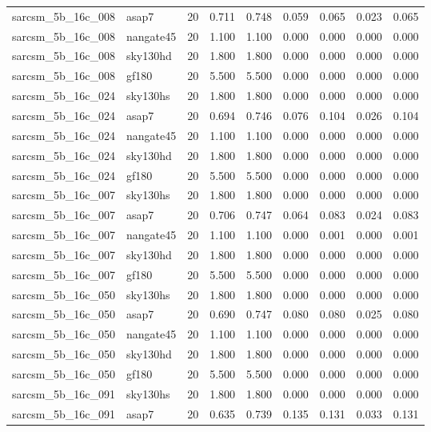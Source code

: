 \begin{tabular}{llrrrrrrr}
sarcsm\_5b\_16c\_008 & asap7 & 20 & 0.711 & 0.748 & 0.059 & 0.065 & 0.023 & 0.065 \\
sarcsm\_5b\_16c\_008 & nangate45 & 20 & 1.100 & 1.100 & 0.000 & 0.000 & 0.000 & 0.000 \\
sarcsm\_5b\_16c\_008 & sky130hd & 20 & 1.800 & 1.800 & 0.000 & 0.000 & 0.000 & 0.000 \\
sarcsm\_5b\_16c\_008 & gf180 & 20 & 5.500 & 5.500 & 0.000 & 0.000 & 0.000 & 0.000 \\
sarcsm\_5b\_16c\_024 & sky130hs & 20 & 1.800 & 1.800 & 0.000 & 0.000 & 0.000 & 0.000 \\
sarcsm\_5b\_16c\_024 & asap7 & 20 & 0.694 & 0.746 & 0.076 & 0.104 & 0.026 & 0.104 \\
sarcsm\_5b\_16c\_024 & nangate45 & 20 & 1.100 & 1.100 & 0.000 & 0.000 & 0.000 & 0.000 \\
sarcsm\_5b\_16c\_024 & sky130hd & 20 & 1.800 & 1.800 & 0.000 & 0.000 & 0.000 & 0.000 \\
sarcsm\_5b\_16c\_024 & gf180 & 20 & 5.500 & 5.500 & 0.000 & 0.000 & 0.000 & 0.000 \\
sarcsm\_5b\_16c\_007 & sky130hs & 20 & 1.800 & 1.800 & 0.000 & 0.000 & 0.000 & 0.000 \\
sarcsm\_5b\_16c\_007 & asap7 & 20 & 0.706 & 0.747 & 0.064 & 0.083 & 0.024 & 0.083 \\
sarcsm\_5b\_16c\_007 & nangate45 & 20 & 1.100 & 1.100 & 0.000 & 0.001 & 0.000 & 0.001 \\
sarcsm\_5b\_16c\_007 & sky130hd & 20 & 1.800 & 1.800 & 0.000 & 0.000 & 0.000 & 0.000 \\
sarcsm\_5b\_16c\_007 & gf180 & 20 & 5.500 & 5.500 & 0.000 & 0.000 & 0.000 & 0.000 \\
sarcsm\_5b\_16c\_050 & sky130hs & 20 & 1.800 & 1.800 & 0.000 & 0.000 & 0.000 & 0.000 \\
sarcsm\_5b\_16c\_050 & asap7 & 20 & 0.690 & 0.747 & 0.080 & 0.080 & 0.025 & 0.080 \\
sarcsm\_5b\_16c\_050 & nangate45 & 20 & 1.100 & 1.100 & 0.000 & 0.000 & 0.000 & 0.000 \\
sarcsm\_5b\_16c\_050 & sky130hd & 20 & 1.800 & 1.800 & 0.000 & 0.000 & 0.000 & 0.000 \\
sarcsm\_5b\_16c\_050 & gf180 & 20 & 5.500 & 5.500 & 0.000 & 0.000 & 0.000 & 0.000 \\
sarcsm\_5b\_16c\_091 & sky130hs & 20 & 1.800 & 1.800 & 0.000 & 0.000 & 0.000 & 0.000 \\
sarcsm\_5b\_16c\_091 & asap7 & 20 & 0.635 & 0.739 & 0.135 & 0.131 & 0.033 & 0.131 \\

\end{tabular}
